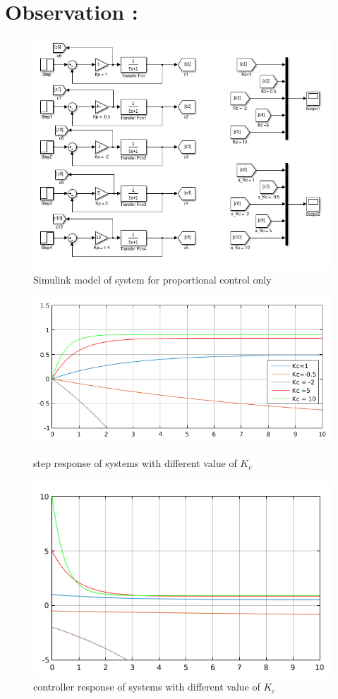 \message{ !name(lab1.tex)}\documentclass[a4paper,12pt,openany]{book}
\begin{document}
\section{Observation :}
\begin{figure}[h!]
  \includegraphics[width = 165mm, scale = 0.85]{lab05part01.png}
  \caption{Simulink model of system for proportional control only}
\end{figure}
\begin{figure}[H]
  \includegraphics[width = 165mm, scale = 0.85]{lab05part11.png}
  \caption{step response of systems with different value of $K_c$}
  \includegraphics[width = 165mm, scale = 0.85]{lab05part12.png}
  \caption{controller response of systems with different value of $K_c$} 
\end{figure}
\end{document}
